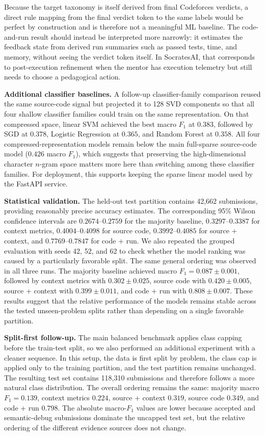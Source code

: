 \documentclass[conference]{IEEEtran}
\begin{document}
Because the target taxonomy is itself derived from final Codeforces verdicts, a direct rule mapping from the final verdict token to the same labels would be perfect by construction and is therefore not a meaningful ML baseline. The code-and-run result should instead be interpreted more narrowly: it estimates the feedback state from derived run summaries such as passed tests, time, and memory, without seeing the verdict token itself. In SocratesAI, that corresponds to post-execution refinement when the mentor has execution telemetry but still needs to choose a pedagogical action.

\textbf{Additional classifier baselines.} A follow-up classifier-family comparison reused the same source-code signal but projected it to 128 SVD components so that all four shallow classifier families could train on the same representation. On that compressed space, linear SVM achieved the best macro $F_1$ at $0.383$, followed by SGD at $0.378$, Logistic Regression at $0.365$, and Random Forest at $0.358$. All four compressed-representation models remain below the main full-sparse source-code model ($0.426$ macro $F_1$), which suggests that preserving the high-dimensional character $n$-gram space matters more here than switching among these classifier families. For deployment, this supports keeping the sparse linear model used by the FastAPI service.

\textbf{Statistical validation.} The held-out test partition contains 42,662 submissions, providing reasonably precise accuracy estimates. The corresponding 95\% Wilson confidence intervals are $0.2674$--$0.2759$ for the majority baseline, $0.3297$--$0.3387$ for context metrics, $0.4004$--$0.4098$ for source code, $0.3992$--$0.4085$ for source + context, and $0.7769$--$0.7847$ for code + run. We also repeated the grouped evaluation with seeds 42, 52, and 62 to check whether the model ranking was caused by a particularly favorable split. The same general ordering was observed in all three runs. The majority baseline achieved macro $F_1=0.087 \pm 0.001$, followed by context metrics with $0.302 \pm 0.025$, source code with $0.420 \pm 0.005$, source + context with $0.399 \pm 0.011$, and code + run with $0.808 \pm 0.007$. These results suggest that the relative performance of the models remains stable across the tested unseen-problem splits rather than depending on a single favorable partition.

\textbf{Split-first follow-up.} The main balanced benchmark applies class capping before the train-test split, so we also performed an additional experiment with a cleaner sequence. In this setup, the data is first split by problem, the class cap is applied only to the training partition, and the test partition remains unchanged. The resulting test set contains 118,310 submissions and therefore follows a more natural class distribution. The overall ordering remains the same: majority macro $F_1=0.139$, context metrics $0.224$, source + context $0.319$, source code $0.349$, and code + run $0.798$. The absolute macro-$F_1$ values are lower because accepted and semantic-debug submissions dominate the uncapped test set, but the relative ordering of the different evidence sources does not change.
\end{document}
